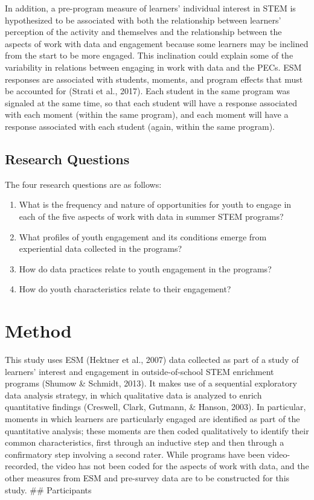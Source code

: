 \documentclass[]{book}
\providecommand{\tightlist}{%
  \setlength{\itemsep}{0pt}\setlength{\parskip}{0pt}}
\theoremstyle{definition}
\theoremstyle{definition}
\theoremstyle{definition}
\theoremstyle{remark}
\begin{document}
In addition, a pre-program measure of learners' individual interest in
STEM is hypothesized to be associated with both the relationship between
learners' perception of the activity and themselves and the relationship
between the aspects of work with data and engagement because some
learners may be inclined from the start to be more engaged. This
inclination could explain some of the variability in relations between
engaging in work with data and the PECs. ESM responses are associated
with students, moments, and program effects that must be accounted for
(Strati et al., 2017). Each student in the same program was signaled at
the same time, so that each student will have a response associated with
each moment (within the same program), and each moment will have a
response associated with each student (again, within the same program).

\section{Research Questions}\label{research-questions}

The four research questions are as follows:

\begin{enumerate}
\def\labelenumi{\arabic{enumi}.}
\tightlist
\item
  What is the frequency and nature of opportunities for youth to engage
  in each of the five aspects of work with data in summer STEM programs?
\item
  What profiles of youth engagement and its conditions emerge from
  experiential data collected in the programs?
\item
  How do data practices relate to youth engagement in the programs?
\item
  How do youth characteristics relate to their engagement?
\end{enumerate}

\chapter{Method}\label{method}

This study uses ESM (Hektner et al., 2007) data collected as part of a
study of learners' interest and engagement in outside-of-school STEM
enrichment programs (Shumow \& Schmidt, 2013). It makes use of a
sequential exploratory data analysis strategy, in which qualitative data
is analyzed to enrich quantitative findings (Creswell, Clark, Gutmann,
\& Hanson, 2003). In particular, moments in which learners are
particularly engaged are identified as part of the quantitative
analysis; these moments are then coded qualitatively to identify their
common characteristics, first through an inductive step and then through
a confirmatory step involving a second rater. While programs have been
video-recorded, the video has not been coded for the aspects of work
with data, and the other measures from ESM and pre-survey data are to be
constructed for this study. \#\# Participants
\end{document}
